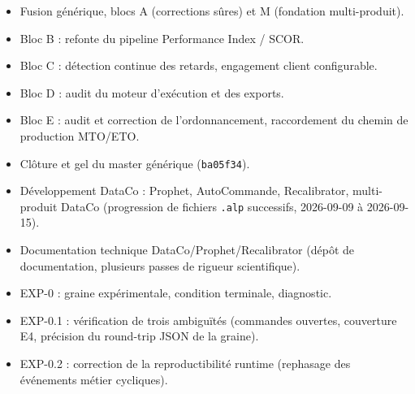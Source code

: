 \documentclass[11pt,a4paper]{article}
\newcommand{\code}[1]{\texttt{#1}}
\begin{document}
\begin{itemize}
  \item Fusion générique, blocs A (corrections sûres) et M (fondation
        multi-produit).
  \item Bloc B : refonte du pipeline Performance Index / SCOR.
  \item Bloc C : détection continue des retards, engagement client
        configurable.
  \item Bloc D : audit du moteur d'exécution et des exports.
  \item Bloc E : audit et correction de l'ordonnancement, raccordement du
        chemin de production MTO/ETO.
  \item Clôture et gel du master générique (\code{ba05f34}).
  \item Développement DataCo : Prophet, AutoCommande, Recalibrator,
        multi-produit DataCo (progression de fichiers \code{.alp}
        successifs, 2026-09-09 à 2026-09-15).
  \item Documentation technique DataCo/Prophet/Recalibrator (dépôt de
        documentation, plusieurs passes de rigueur scientifique).
  \item EXP-0 : graine expérimentale, condition terminale, diagnostic.
  \item EXP-0.1 : vérification de trois ambiguïtés (commandes ouvertes,
        couverture E4, précision du round-trip JSON de la graine).
  \item EXP-0.2 : correction de la reproductibilité runtime (rephasage des
        événements métier cycliques).
\end{itemize}
\end{document}
